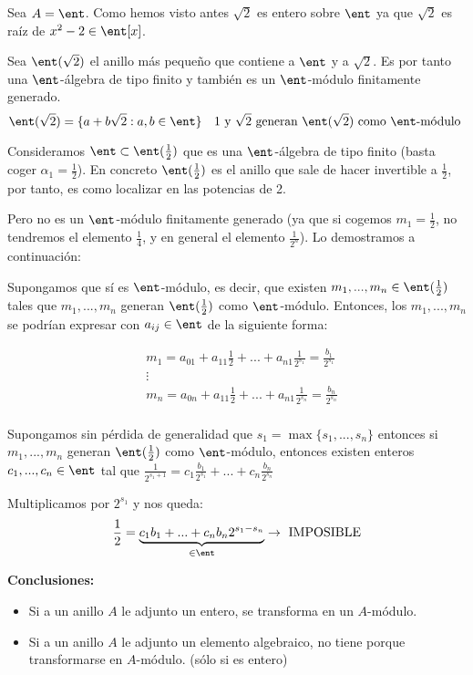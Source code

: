 \begin{example}
	Sea $A= \ent$. Como hemos visto antes $\sqrt{2}$ es entero sobre $\ent$ ya que $\sqrt{2}$ es raíz de $x^2-2 \in \ent[x]$.

	Sea $\ent(\sqrt{2})$ el anillo más pequeño que contiene a $\ent$ y a $\sqrt{2}$. Es por tanto una $\ent$-álgebra de tipo finito y también es un $\ent$-módulo finitamente generado.
	$$ \ent(\sqrt{2})=\{ a+b\sqrt{2}:a,b \in \ent \} \quad \text {1 y }\sqrt{2} \text{ generan } \ent(\sqrt{2}) \text{ como } \ent\text{-módulo }$$

	Consideramos $\ent \subset \ent(\frac{1}{2})$ que es una $\ent$-álgebra de tipo finito (basta coger $\alpha_1=\frac{1}{2}$). En concreto  $\ent(\frac{1}{2})$ es el anillo que sale de hacer invertible a $\frac{1}{2}$, por tanto, es como localizar en las potencias de 2.

	Pero no es un $\ent$-módulo finitamente generado (ya que si cogemos $m_1=\frac{1}{2}$, no tendremos el elemento $\frac{1}{4}$, y en general el elemento $\frac{1}{2^n}$). Lo demostramos a continuación:

	Supongamos que sí es $\ent$-módulo, es decir, que existen $m_1,...,m_n \in \ent(\frac{1}{2})$ tales que $m_1,...,m_n$ generan $\ent(\frac{1}{2})$ como $\ent$-módulo. Entonces, los $m_1,...,m_n$ se podrían expresar con $a_{ij} \in \ent$ de la siguiente forma:

	\begin{align*}
		& m_1=a_{01}+a_{11}\frac{1}{2}+...+a_{n1}\frac{1}{2^{s_1}} = \frac{b_1}{2^{s_1}} \\
		& \vdots \\
		& m_n=a_{0n}+a_{11}\frac{1}{2}+...+a_{n1}\frac{1}{2^{s_n}} = \frac{b_n}{2^{s_n}} \\
	\end{align*}

	Supongamos sin pérdida de generalidad que  $s_1 = \max\{s_1,...,s_n\}$ entonces si $m_1,...,m_n$ generan $\ent(\frac{1}{2})$ como $\ent$-módulo, entonces existen enteros $c_1,...,c_n \in \ent$ tal que $\frac{1}{2^{s_1+1}}=c_1\frac{b_1}{2^{s_1}}+...+c_n\frac{b_n}{2^{s_n}}$

	Multiplicamos por $2^{s_1}$ y nos queda:
	$$ \frac{1}{2} = \underbrace{c_1 b_1+...+c_nb_n2^{s_1-s_n}}_{\in \ent} \rightarrow \text{ IMPOSIBLE} $$
\end{example}

\textbf{Conclusiones:}
\begin{itemize}
	\item Si a un anillo $A$ le adjunto un entero, se transforma en un $A$-módulo.
	\item Si a un anillo $A$ le adjunto un elemento algebraico, no tiene porque transformarse en $A$-módulo. (sólo si es entero)
\end{itemize}

